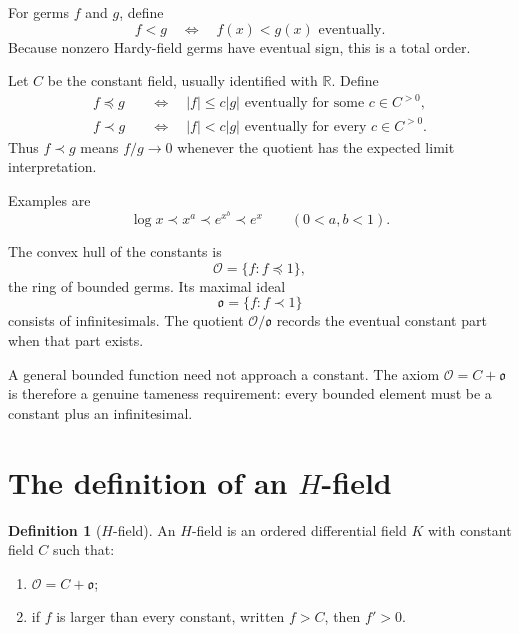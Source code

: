 \documentclass[11pt,openany]{book}
\theoremstyle{definition}
\newtheorem{definition}{Definition}[chapter]
\theoremstyle{plain}
\theoremstyle{remark}
\newcommand{\R}{\mathbb{R}}
\newcommand{\precdom}{\prec}
\begin{document}
For germs $f$ and $g$, define
\[
 f<g
 \quad\Longleftrightarrow\quad
 f(x)<g(x)\text{ eventually}.
\]
Because nonzero Hardy-field germs have eventual sign, this is a total order.

Let $C$ be the constant field, usually identified with $\R$. Define
\begin{align}
 f\preceq g
 &\quad\Longleftrightarrow\quad
 |f|\le c|g|\text{ eventually for some }c\in C^{>0},
 \label{eq:hardy-dominance}\\
 f\precdom g
 &\quad\Longleftrightarrow\quad
 |f|<c|g|\text{ eventually for every }c\in C^{>0}.
 \label{eq:hardy-strict-dominance}
\end{align}
Thus $f\precdom g$ means $f/g\to0$ whenever the quotient has the expected limit interpretation.

Examples are
\[
 \log x\precdom x^a\precdom e^{x^b}\precdom e^x
 \qquad(0<a,b<1).
\]

The convex hull of the constants is
\begin{equation}\label{eq:hfield-valuation-ring}
 \mathcal O=\{f:f\preceq1\},
\end{equation}
the ring of bounded germs. Its maximal ideal
\begin{equation}\label{eq:hfield-infinitesimals}
 \mathfrak o=\{f:f\precdom1\}
\end{equation}
consists of infinitesimals. The quotient $\mathcal O/\mathfrak o$ records the eventual constant part when that part exists.

\begin{warningbox}
A general bounded function need not approach a constant. The axiom $\mathcal O=C+\mathfrak o$ is therefore a genuine tameness requirement: every bounded element must be a constant plus an infinitesimal.
\end{warningbox}

\section{The definition of an \texorpdfstring{$H$}{H}-field}

\begin{definition}[$H$-field]
An $H$-field is an ordered differential field $K$ with constant field $C$ such that:
\begin{enumerate}
 \item $\mathcal O=C+\mathfrak o$;
 \item if $f$ is larger than every constant, written $f>C$, then $f'>0$.
\end{enumerate}
\end{definition}
\end{document}
